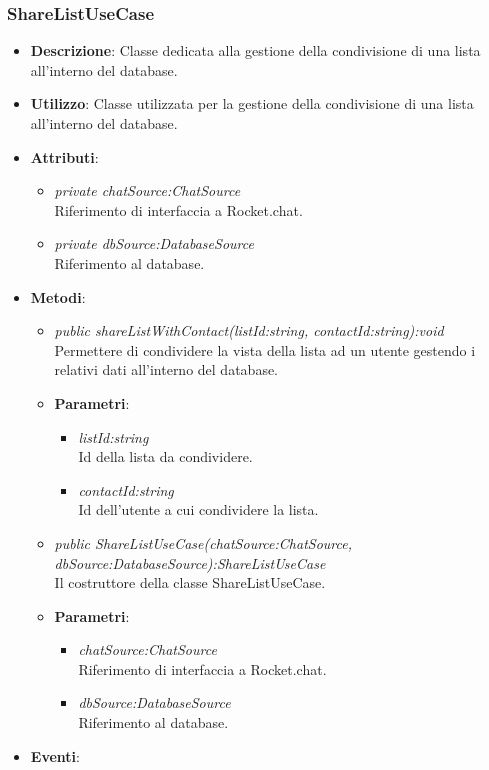 \begin{itemize}
\subsubsection{ShareListUseCase}
\begin{itemize}
\item \textbf{Descrizione}: Classe dedicata alla gestione della condivisione di una lista all'interno del database.
\item \textbf{Utilizzo}: Classe utilizzata per la gestione della condivisione di una lista all'interno del database.
\item \textbf{Attributi}: 
\begin{itemize}
\item \textit{private chatSource:ChatSource}\\
	Riferimento di interfaccia a Rocket.chat.
\item \textit{private dbSource:DatabaseSource}\\
	Riferimento al database.
\end{itemize}
\item \textbf{Metodi}:
\begin{itemize}
\item \textit{public shareListWithContact(listId:string, contactId:string):void}\\
	Permettere di condividere la vista della lista ad un utente gestendo i relativi dati all'interno del database.
	\item{\textbf{Parametri}: \begin{itemize}
	\item \textit{listId:string}\\
	Id della lista da condividere.
	\item \textit{contactId:string}\\
	Id dell'utente a cui condividere la lista.
	\end{itemize}}
\item \textit{public ShareListUseCase(chatSource:ChatSource, dbSource:DatabaseSource):ShareListUseCase}\\
	Il costruttore della classe ShareListUseCase.
	\item{\textbf{Parametri}: \begin{itemize}
	\item \textit{chatSource:ChatSource}\\
	 	Riferimento di interfaccia a Rocket.chat.
	\item \textit{dbSource:DatabaseSource}\\
		Riferimento al database.
	\end{itemize}}
\end{itemize}
\item \textbf{Eventi}:
\end{itemize}


\end{itemize}
